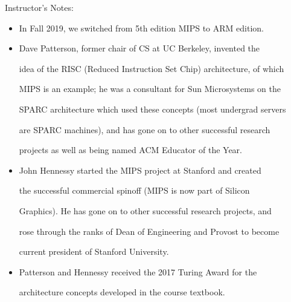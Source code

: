 \begin{frame}[fragile] 

Instructor's Notes: 

\begin{itemize} 

\item In Fall 2019, we switched from 5th edition MIPS to ARM edition. 

  

\item Dave Patterson, former chair of CS at UC Berkeley, invented the 

	idea of the RISC (Reduced Instruction Set Chip) architecture, of which 

	MIPS is an example; he was a consultant for Sun Microsystems on the 

	SPARC architecture which used these concepts (most undergrad servers 

	are SPARC machines), and has gone on to other successful research 

	projects as well as being named ACM Educator of the Year. 

\item John Hennessy started the MIPS project at Stanford and created 

	the successful commercial spinoff (MIPS is now part of Silicon 

	Graphics). He has gone on to other successful research projects, and 

	rose through the ranks of Dean of Engineering and Provost to become 

	current president of Stanford University. 

\item Patterson and Hennessy received the 2017 Turing Award for the  

	architecture concepts developed in the course textbook. 

\end{itemize} 

\end{frame} 


